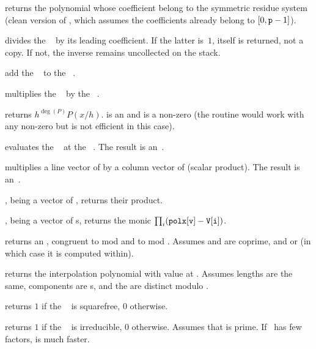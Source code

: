  returns the polynomial whose coefficient
belong to the symmetric residue system (clean version of ,
which assumes the coefficients already belong to $[0,{\tt p}-1]$).


 divides the ~ by its
leading coefficient. If the latter is~$1$,  itself is returned, not a
copy. If not, the inverse remains uncollected on the stack.


 add the ~ to the
~.

 multiplies the ~
by the ~.

 returns $h^{\deg(P)} P(x/h)$.
 is an  and  is a non-zero  (the routine would
work with any non-zero  but is not efficient in this case).

 evaluates the ~
at the ~. The result is an~.

 multiplies a line vector
of by a column vector of  (scalar product). The result is
an~.

,  being a vector of ,
returns their product.

,  being a vector
of s, returns the monic 
$\prod_i ({\tt polx[v]} - {\tt V[i]})$.

returns an , congruent to  mod  and to  mod
. Assumes  and  are coprime, and 
or  (in which case it is computed within).

 returns the 
interpolation polynomial with value  at . Assumes lengths
are the same, components are s, and the  are distinct
modulo .

 returns $1$ if the
~ is squarefree, $0$ otherwise.

 returns $1$ if the ~
is irreducible, $0$ otherwise. Assumes that  is prime. If~ has
few factors,  is much faster.

